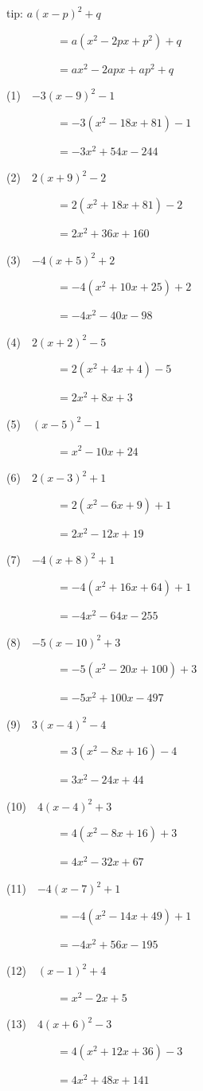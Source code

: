 \documentclass[a4j,twocolumn,10pt,fleqn]{jarticle}
\begin{document}
tip: $a(x - p)^2 + q$

~~~~~~~~~$= a(x^2 - 2px + p^2) + q$

~~~~~~~~~$= ax^2 - 2apx + ap^2 + q$

(1)~~$-3(x-9)^2-1$

~~~~~~~~~$=-3(x^2-18x +81)-1$

~~~~~~~~~$=-3x^2 +54x-244$

(2)~~$2(x +9)^2-2$

~~~~~~~~~$=2(x^2 +18x +81)-2$

~~~~~~~~~$=2x^2 +36x +160$

(3)~~$-4(x +5)^2 +2$

~~~~~~~~~$=-4(x^2 +10x +25) +2$

~~~~~~~~~$=-4x^2-40x-98$

(4)~~$2(x +2)^2-5$

~~~~~~~~~$=2(x^2 +4x +4)-5$

~~~~~~~~~$=2x^2 +8x +3$

(5)~~$(x-5)^2-1$

~~~~~~~~~$=x^2-10x +24$

(6)~~$2(x-3)^2 +1$

~~~~~~~~~$=2(x^2-6x +9) +1$

~~~~~~~~~$=2x^2-12x +19$

(7)~~$-4(x +8)^2 +1$

~~~~~~~~~$=-4(x^2 +16x +64) +1$

~~~~~~~~~$=-4x^2-64x-255$

(8)~~$-5(x-10)^2 +3$

~~~~~~~~~$=-5(x^2-20x +100) +3$

~~~~~~~~~$=-5x^2 +100x-497$

(9)~~$3(x-4)^2-4$

~~~~~~~~~$=3(x^2-8x +16)-4$

~~~~~~~~~$=3x^2-24x +44$

(10)~~$4(x-4)^2 +3$

~~~~~~~~~$=4(x^2-8x +16) +3$

~~~~~~~~~$=4x^2-32x +67$

(11)~~$-4(x-7)^2 +1$

~~~~~~~~~$=-4(x^2-14x +49) +1$

~~~~~~~~~$=-4x^2 +56x-195$

(12)~~$(x-1)^2 +4$

~~~~~~~~~$=x^2-2x +5$

(13)~~$4(x +6)^2-3$

~~~~~~~~~$=4(x^2 +12x +36)-3$

~~~~~~~~~$=4x^2 +48x +141$
\end{document}
